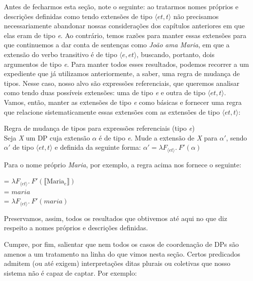 Antes de fecharmos esta seção, note o seguinte: ao tratarmos nomes
próprios e descrições definidas como tendo extensões de tipo
$\langle et,t\rangle$ não precisamos necessariamente abandonar
nossas considerações dos capítulos anteriores em que elas eram de
tipo \textit{e}. Ao contrário, temos razões para manter essas
extensões para que continuemos a dar conta de sentenças como
\textit{João ama Maria}, em que a extensão do verbo transitivo é
de tipo $\langle e,et\rangle$, buscando, portanto, dois argumentos
de tipo \textit{e}. Para manter todos esses resultados, podemos
recorrer a um expediente que já utilizamos anteriormente, a saber,
uma regra de mudança de tipos. Nesse caso, nosso alvo são
expressões referenciais, que queremos analisar como tendo duas
possíveis extensões: uma de tipo \textit{e} e outra de tipo
$\langle et,t\rangle$. Vamos, então, manter as extensões de tipo
\textit{e} como básicas e fornecer uma regra que relacione
sistematicamente essas extensões com as extensões de tipo $\langle et,t\rangle$:

\begin{exe}
	\ex Regra de mudança de tipos para expressões referenciais (tipo \textit{e}) \\
	Seja \textit{X} um DP cuja extensão $\alpha$ é de tipo \textit{e}. Mude a extensão de \textit{X} para $\alpha '$, sendo $\alpha '$ de tipo $\langle et,t\rangle$ e definida da seguinte forma: $\alpha' = \lambda F_{\langle et\rangle}.\ F'(\alpha)$
\end{exe}


\n Para o nome próprio \textit{Maria}, por exemplo, a regra acima nos fornece o seguinte:

\begin{exe}
	\ex {} = $\lambda F_{\langle et\rangle}.\ F'(\llbracket\text{Maria}_{e}\rrbracket)$\\
	 = $maria$\\
	 = $\lambda F_{\langle et\rangle}.\ F'(maria)$
\end{exe}

\n Preservamos, assim, todos os resultados que obtivemos até aqui no
que diz respeito a nomes próprios e descrições definidas.

Cumpre, por fim, salientar que nem todos os casos de coordenação de DPs são amenos a um tratamento na linha do que vimos nesta seção. Certos predicados admitem (ou até exigem) interpretações ditas plurais ou coletivas que nosso sistema não é capaz de captar. Por exemplo:


